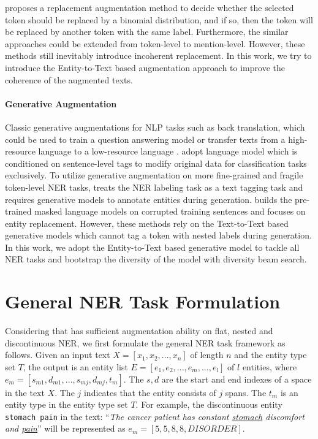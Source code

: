 \citet{dai-adel-2020-analysis} proposes a replacement augmentation method to decide whether the selected token should be replaced by a binomial distribution, and if so, then the token will be replaced by another token with the same label. Furthermore, the similar approaches could be extended from token-level to mention-level.
However, these methods still inevitably introduce incoherent replacement. In this work, we try to introduce the Entity-to-Text based augmentation approach to improve the coherence of the augmented texts.

\paragraph{Generative Augmentation}
Classic generative augmentations for NLP tasks such as back translation, which could be used to train a question answering model \cite{yu2018qanet} or transfer texts from a high-resource language to a low-resource language \cite{hou2018sequence,xia2019generalized}. 
\citet{anaby2020not,kumar2020data} adopt language model which is conditioned on sentence-level tags to modify original data for classification tasks exclusively. 
To utilize generative augmentation on more fine-grained and fragile token-level NER tasks, \citet{ding-etal-2020-daga} treats the NER labeling task as a text tagging task and requires generative models to annotate entities during generation. \citet{zhou2022melm} builds the pre-trained masked language models on corrupted training sentences and focuses on entity replacement. However, these methods rely on the Text-to-Text based generative models which cannot tag a token with nested labels during generation. In this work, we adopt the Entity-to-Text based generative model to tackle all NER tasks and bootstrap the diversity of the model with diversity beam search.

\section{General NER Task Formulation}\label{NER Tasks}
Considering that {\modelname} has sufficient augmentation ability on flat, nested and discontinuous NER, we first formulate the general NER task framework as follows. Given an input text ${X = [x_{1}, x_{2}, ..., x_{n}]}$ of length ${n}$ and the entity type set ${T}$, the output is an entity list ${E = [{e}_{1}, {e}_{2}, ..., {e}_{m}, ..., {e}_{l}]}$ of ${l}$ entities, where ${{e}_{m}=\left[s_{m1}, d_{m1}, ..., s_{mj}, d_{mj}, t_{m}\right]}$. The ${s,d}$ are the start and end indexes of a space in the text ${X}$. The ${j}$ indicates that the entity consists of ${j}$ spans. The $t_{m}$ is an entity type in the entity type set ${T}$. 
For example, the discontinuous entity \texttt{stomach pain} in the text: ``\textit{The cancer patient has constant \underline{stomach} discomfort and \underline{pain}}'' will be represented as ${{e}_{m}=\left[5,5,8,8,DISORDER\right]}$.

